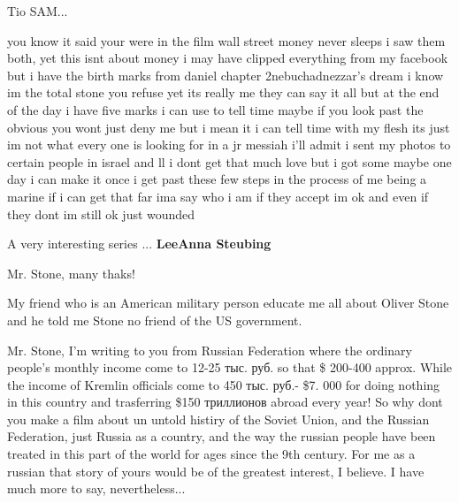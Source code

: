  
 
 
 
 

Tio SAM...


you know it said your were in the film wall street money never sleeps i saw
them both, yet this isnt about money i may have clipped everything from my
facebook but i have the birth marks from daniel chapter 2nebuchadnezzar's dream
i know im the total stone you refuse yet its really me they can say it all but
at the end of the day i have five marks i can use to tell time maybe if you
look past the obvious you wont just deny me but i mean it i can tell time with
my flesh its just im not what every one is looking for in a jr messiah i'll
admit i sent my photos to certain people in israel and ll i dont get that much
love but i got some maybe one day i can make it once i get past these few steps
in the process of me being a marine if i can get that far ima say who i am if
they accept im ok and even if they dont im still ok just wounded

A very interesting series ...
\textbf{LeeAnna Steubing}

Mr. Stone, many thaks!


My friend who is an American military person educate me all about Oliver Stone
and he told me Stone no friend of the US government.



Mr. Stone, I'm writing to you from Russian Federation where the ordinary people's
monthly income come to 12-25 тыс. руб. so that \$ 200-400 approx. While the income
of Kremlin officials come to 450 тыс. руб.- \$7. 000 for doing nothing in this
country and trasferring \$150 триллионов abroad every year! So why dont you make a
film about un untold histiry of the Soviet Union, and the Russian Federation,
just Russia as a country, and the way the russian people have been treated in
this part of the world for ages since the 9th century. For me as a russian that
story of yours would be of the greatest interest, I believe. I have much more to
say, nevertheless...
